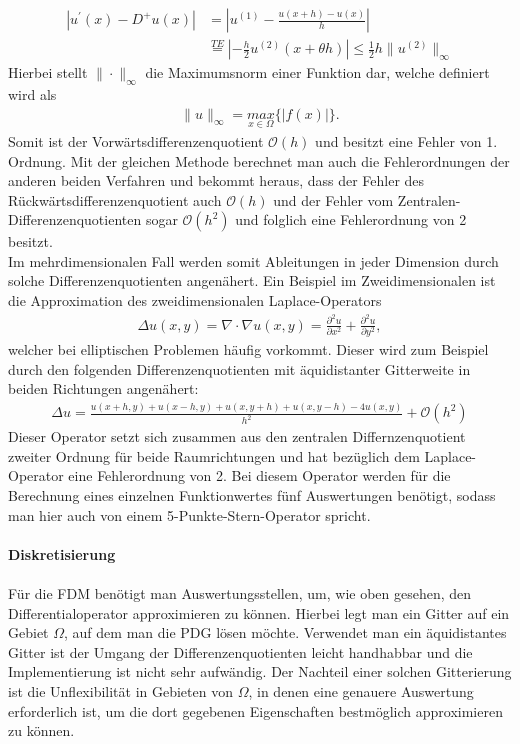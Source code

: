 \documentclass[12pt,titlepage]{article}
\begin{document}
\begin{align}
 |u^{'}(x)-D^+u(x)|&=|u^{(1)}-\frac{u(x+h)-u(x)}{h}|\nonumber\\&\overset{TE}{=}|-\frac{h}{2}u^{(2)}(x+\theta h)|\le\frac{1}{2} h\|u^{(2)}\|_{\infty}\nonumber
\end{align}
Hierbei stellt $\|\cdot\|_{\infty}$ die Maximumsnorm einer Funktion dar, welche definiert wird als
\begin{align}
 \|u\|_{\infty}=\underset{x\in\Omega}{max}\{|f(x)|\}.\nonumber
\end{align}
Somit ist der Vorwärtsdifferenzenquotient $\mathcal{O}(h)$ und besitzt eine Fehler von 1. Ordnung. Mit der gleichen Methode berechnet man auch die Fehlerordnungen der anderen beiden Verfahren und bekommt heraus, dass der Fehler des Rückwärtsdifferenzenquotient auch $\mathcal{O}(h)$ und der Fehler vom Zentralen-Differenzenquotienten sogar $\mathcal{O}(h^2)$ und folglich eine Fehlerordnung von 2 besitzt.\\
Im mehrdimensionalen Fall werden somit Ableitungen in jeder Dimension durch solche Differenzenquotienten angenähert. Ein Beispiel im Zweidimensionalen ist die Approximation des zweidimensionalen Laplace-Operators
\begin{align}
 \Delta u(x,y)=\nabla\cdot\nabla u(x,y)=\frac{\partial^2u}{\partial x^2}+\frac{\partial^2u}{\partial y^2},\nonumber
\end{align}
welcher bei elliptischen Problemen häufig vorkommt. Dieser wird zum Beispiel durch den folgenden Differenzenquotienten mit äquidistanter Gitterweite in beiden Richtungen angenähert:
 \small
\begin{align}
 \Delta u=\frac{u(x+h,y)+u(x-h,y)+u(x,y+h)+u(x,y-h)-4u(x,y)}{h^2}+\mathcal{O}(h^2)\nonumber
\end{align}
\normalsize
Dieser Operator setzt sich zusammen aus den zentralen Differnzenquotient zweiter Ordnung für beide Raumrichtungen und hat bezüglich dem Laplace-Operator eine Fehlerordnung von 2. Bei diesem Operator werden für die Berechnung eines einzelnen Funktionwertes fünf Auswertungen benötigt, sodass man hier auch von einem 5-Punkte-Stern-Operator spricht.\\\\
\textbf{Diskretisierung}\\\\
Für die FDM benötigt man Auswertungsstellen, um, wie oben gesehen, den Differentialoperator approximieren zu können. Hierbei legt man ein Gitter auf ein Gebiet $\Omega$, auf dem man die PDG lösen möchte. Verwendet man ein äquidistantes Gitter ist der Umgang der Differenzenquotienten leicht handhabbar und die Implementierung ist nicht sehr aufwändig. Der Nachteil einer solchen Gitterierung ist die Unflexibilität in Gebieten von $\Omega$, in denen eine genauere Auswertung erforderlich ist, um die dort gegebenen Eigenschaften bestmöglich approximieren zu können.\\
\end{document}
